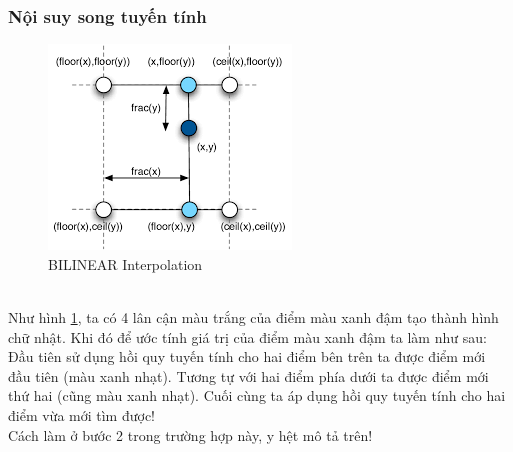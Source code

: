 \documentclass{article}
\begin{document}
\subsubsection*{Nội suy song tuyến tính}
\begin{figure}[ht!]
    \centering
    \includegraphics[width = 0.4\linewidth]{fig12.png}
    \caption{BILINEAR Interpolation}
    \label{fig12}
\end{figure}
\phantom{a}\\
Như hình \ref{fig12}, ta có 4 lân cận màu trắng của điểm màu xanh đậm tạo thành hình chữ nhật. Khi đó để ước tính giá trị của điểm màu xanh đậm ta làm như sau: Đầu tiên sử dụng hồi quy tuyến tính cho hai điểm bên trên ta được điểm mới đầu tiên (màu xanh nhạt). Tương tự với hai điểm phía dưới ta được điểm mới thứ hai (cũng màu xanh nhạt). Cuối cùng ta áp dụng hồi quy tuyến tính cho hai điểm vừa mới tìm được!\\
Cách làm ở bước 2 trong trường hợp này, y hệt mô tả trên!
\end{document}
